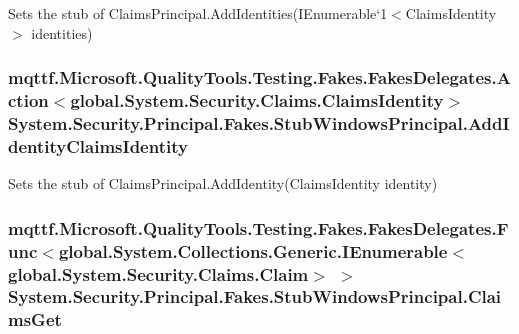 Sets the stub of Claims\-Principal.\-Add\-Identities(I\-Enumerable`1$<$Claims\-Identity$>$ identities)

\hypertarget{class_system_1_1_security_1_1_principal_1_1_fakes_1_1_stub_windows_principal_ae93f788e98cb5456b80b9a78d36bb976}{
\subsubsection[{Add\-Identity\-Claims\-Identity}]{\setlength{\rightskip}{0pt plus 5cm}mqttf.\-Microsoft.\-Quality\-Tools.\-Testing.\-Fakes.\-Fakes\-Delegates.\-Action$<$global.\-System.\-Security.\-Claims.\-Claims\-Identity$>$ System.\-Security.\-Principal.\-Fakes.\-Stub\-Windows\-Principal.\-Add\-Identity\-Claims\-Identity}}\label{class_system_1_1_security_1_1_principal_1_1_fakes_1_1_stub_windows_principal_ae93f788e98cb5456b80b9a78d36bb976}


Sets the stub of Claims\-Principal.\-Add\-Identity(\-Claims\-Identity identity)

\hypertarget{class_system_1_1_security_1_1_principal_1_1_fakes_1_1_stub_windows_principal_a3209f6df5035483df50388a57ee74291}{
\subsubsection[{Claims\-Get}]{\setlength{\rightskip}{0pt plus 5cm}mqttf.\-Microsoft.\-Quality\-Tools.\-Testing.\-Fakes.\-Fakes\-Delegates.\-Func$<$global.\-System.\-Collections.\-Generic.\-I\-Enumerable$<$global.\-System.\-Security.\-Claims.\-Claim$>$ $>$ System.\-Security.\-Principal.\-Fakes.\-Stub\-Windows\-Principal.\-Claims\-Get}}\label{class_system_1_1_security_1_1_principal_1_1_fakes_1_1_stub_windows_principal_a3209f6df5035483df50388a57ee74291}


